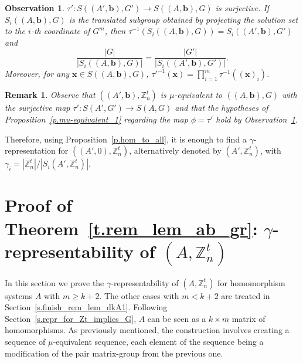 \documentclass[10pt]{article}
\newtheorem{remark}[theorem]{Remark}
\newtheorem{observation}[theorem]{Observation}
\newcommand{\Z}{\mathbb Z}
\begin{document}
\begin{observation} \label{o.same_gamma} $\tau':S((A',\mathbf{b}),G')\to S((A,\mathbf{b}),G)$ is surjective.
	If $S_i((A,\mathbf{b}),G)$ is the translated subgroup obtained by projecting the solution set to the $i$-th coordinate of $G^m$, then $\tau^{-1}(S_i((A,\mathbf{b}),G))=S_i((A',\mathbf{b}),G')$ and
\begin{displaymath}
	\frac{|G|}{|S_i((A,\mathbf{b}),G)|}=\frac{|G'|}{|S_i((A',\mathbf{b}),G')|}.
\end{displaymath}
Moreover, for any $\mathbf{x}\in S((A,\mathbf{b}),G)$, $\tau'^{-1}(\mathbf{x})=\prod_{i=1}^m \tau^{-1}((\mathbf{x})_i)$.
\end{observation}


\begin{remark} \label{r.1}
Observe that $((A',\mathbf{b}),\Z_n^t)$ is $\mu$-equivalent to $((A,\mathbf{b}),G)$ with the surjective map $\tau':S(A',G')\to S(A,G)$ and that the hypotheses of Proposition~\ref{p.mu-equivalent_1} regarding the map $\phi=\tau'$ hold by Observation~\ref{o.same_gamma}. 
\end{remark}

Therefore, using Proposition~\ref{p.hom_to_all}, it is enough to find a $\gamma$-representation for $((A',0),\Z_n^t)$, alternatively denoted by $(A',\Z_n^t)$, with $\gamma_i=|\Z_n^t|/|S_i(A',\Z_n^t)|$.






\section{Proof of Theorem~\ref{t.rem_lem_ab_gr}: $\gamma$-representability of $(A,\Z_n^t)$} \label{s.representability_product_cyclics}

In this section we prove the $\gamma$-representability of $(A,\Z_n^t)$ for homomorphism systems $A$ with $m\geq k+2$. The other cases with $m<k+2$ are treated in Section~\ref{s.finish_rem_lem_dkA1}. 
Following Section~\ref{s.repr_for_Zt_implies_G}, $A$ can be seen as a $k\times m$ matrix of homomorphisms. As previously mentioned, the construction involves creating a sequence of $\mu$-equivalent sequence, each element of the sequence being a modification of the pair matrix-group from the previous one. 
\end{document}
